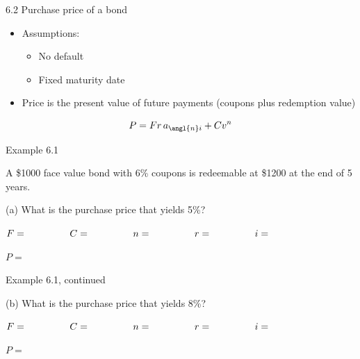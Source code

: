 \documentclass{beamer}
\begin{document}
\begin{frame}{6.2 Purchase price of a bond}

\begin{itemize}
\item Assumptions:
  \begin{itemize}
  \item No default
  \item Fixed maturity date
  \end{itemize}
\item Price is the present value of future payments (coupons plus redemption value)
\end{itemize}

\begin{center}
\end{center}

\[
P = Fr\,a_{\angl{n}i} + Cv^n
\]

\end{frame}

\begin{frame}{Example 6.1}

A \$1000 face value bond with 6\% coupons is redeemable at \$1200 at the end of 5 years.

\medskip
(a) What is the purchase price that yields 5\%?

\medskip
$F = \hspace{1.2cm} \quad C = \hspace{1.2cm} \quad n = \hspace{1.2cm} \quad r = \hspace{1.2cm} \quad i = $

\begin{center}
\end{center}

$P =$

\vfill
\end{frame}

\begin{frame}{Example 6.1, continued}

(b) What is the purchase price that yields 8\%?

\medskip
$F = \hspace{1.2cm} \quad C = \hspace{1.2cm} \quad n = \hspace{1.2cm} \quad r = \hspace{1.2cm} \quad i = $

\begin{center}
\end{center}

$P =$

\vfill
\end{frame}
\end{document}

